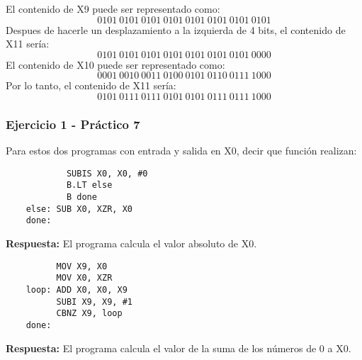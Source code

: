 \documentclass[aspectradio=43]{beamer}
\begin{document}
\begin{frame}
    El contenido de X9 puede ser representado como:
    \begin{equation*}
        \scriptstyle
        0101\ 0101\ 0101\ 0101\ 0101\ 0101\ 0101\ 0101
    \end{equation*}
    Despues de hacerle un desplazamiento a la izquierda de 4 bits, el contenido de X11 sería:
    \begin{equation*}
        \scriptstyle
        0101\ 0101\ 0101\ 0101\ 0101\ 0101\ 0101\ 0000
    \end{equation*}
    El contenido de X10 puede ser representado como:
    \begin{equation*}
        \scriptstyle
        0001\ 0010\ 0011\ 0100\ 0101\ 0110\ 0111\ 1000
    \end{equation*}    
    Por lo tanto, el contenido de X11 sería:
    \begin{equation*}
        \scriptstyle
        0101\ 0111\ 0111\ 0101\ 0101\ 0111\ 0111\ 1000 
    \end{equation*}
\end{frame}

\begin{frame}[containsverbatim]
    \frametitle{Ejercicio 1 - Práctico 7}
    Para estos dos programas con entrada y salida en X0, decir que función realizan:
    \begin{verbatim}
            SUBIS X0, X0, #0
            B.LT else
            B done
    else: SUB X0, XZR, X0
    done:
    \end{verbatim}
    \textbf{Respuesta:} El programa calcula el valor absoluto de X0.
\end{frame}

\begin{frame}[containsverbatim]
    \begin{verbatim}
          MOV X9, X0
          MOV X0, XZR
    loop: ADD X0, X0, X9
          SUBI X9, X9, #1
          CBNZ X9, loop
    done:
  \end{verbatim}
    \textbf{Respuesta:} El programa calcula el valor de la suma de los números de 0 a X0.
\end{frame}
\end{document}
